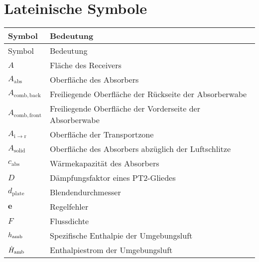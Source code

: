\renewcommand{\arraystretch}{0.93}
\section*{Lateinische Symbole}
\begin{longtable}{p{}p{}}
    Symbol                           & Bedeutung                                                        \\
    \hline
    \endfirsthead
    Symbol                           & Bedeutung                                                        \\
    \hline
    \endhead
    \endfoot
    \endlastfoot
    $A$                              & Fläche des Receivers                                             \\
    $A_{\mathrm{abs}}$               & Oberfläche des Absorbers                                         \\
    $A_{\mathrm{comb,back}}$         & Freiliegende Oberfläche der Rückseite der Absorberwabe           \\
    $A_{\mathrm{comb,front}}$        & Freiliegende Oberfläche der Vorderseite der Absorberwabe         \\
    $A_{\mathrm{i\to r}}$            & Oberfläche der Transportzone                                     \\
    $A_{\mathrm{solid}}$             & Oberfläche des Absorbers abzüglich der Luftschlitze              \\
    $c_{\mathrm{abs}}$               & Wärmekapazität des Absorbers                                     \\
    $D$                              & Dämpfungsfaktor eines PT2-Gliedes                                \\
    $d_{\mathrm{plate}}$             & Blendendurchmesser                                               \\
    $\boldsymbol{e}$                 & Regelfehler                                                      \\
    $F$                              & Flussdichte                                                      \\
    $h_{\mathrm{amb}}$      & Spezifische Enthalpie der Umgebungsluft                          \\
    $\dot{H}_{\mathrm{amb}}$          & Enthalpiestrom der Umgebungsluft                                 \\

\end{longtable}
